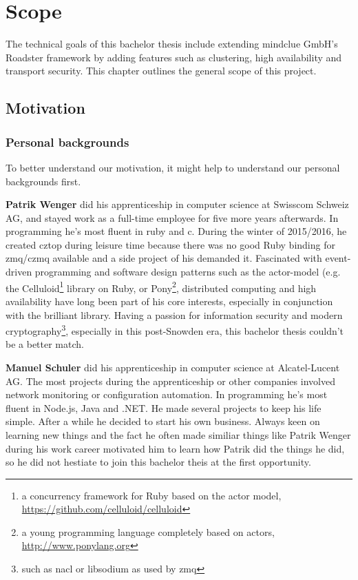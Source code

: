 \chapter{Scope}
The technical goals of this bachelor thesis include extending mindclue GmbH's
Roadster framework by adding features such as clustering, high availability and
transport security. This chapter outlines the general scope of this project.

\section{Motivation}
\subsection{Personal backgrounds}
To better understand our motivation, it might help to understand our personal
backgrounds first.

\textbf{Patrik Wenger} did his apprenticeship in computer science at Swisscom
Schweiz AG, and stayed work as a full-time employee for five more years
afterwards. In programming he's most fluent in \gls{ruby} and \gls{c}. During
the winter of 2015/2016, he created \gls{cztop} during leisure time because
there was no good Ruby binding for \gls{zmq}/\gls{czmq} available and a side
project of his demanded it. Fascinated with event-driven programming and
software design patterns such as the \gls{actor-model} (e.g. the
Celluloid\footnote{a concurrency framework for Ruby based on the actor model,
\url{https://github.com/celluloid/celluloid}} library on Ruby, or
Pony\footnote{a young programming language completely based on actors,
\url{http://www.ponylang.org}}, distributed computing and high availability
have long been part of his core interests, especially in conjunction with the
brilliant \zmq library. Having a passion for information security and modern
cryptography\footnote{such as \gls{nacl} or \gls{libsodium} as used by
\gls{zmq}}, especially in this post-Snowden era, this bachelor thesis couldn't
be a better match.

\textbf{Manuel Schuler} did his apprenticeship in computer science at Alcatel-Lucent AG.
The most projects during the apprenticeship or other companies involved network monitoring or
configuration automation. In programming he's most fluent in Node.js, Java and .NET. He
made several projects to keep his life simple. After a while he decided to start his own business.
Always keen on learning new things and the fact he often made similiar things like Patrik Wenger during his work
career motivated him to learn how Patrik did the things he did,
so he did not hestiate to join this bachelor theis at the first opportunity.

